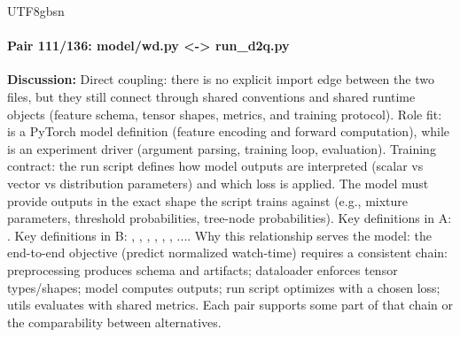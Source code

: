 \documentclass[11pt]{article}
\begin{document}
\begin{CJK*}{UTF8}{gbsn}
\paragraph{Pair 111/136: model/wd.py <-> run\_d2q.py}
\textbf{Discussion:} Direct coupling: there is no explicit import edge between the two files, but they still connect through shared conventions and shared runtime objects (feature schema, tensor shapes, metrics, and training protocol). Role fit: \texttt{} is a PyTorch model definition (feature encoding and forward computation), while \texttt{} is an experiment driver (argument parsing, training loop, evaluation). Training contract: the run script defines how model outputs are interpreted (scalar vs vector vs distribution parameters) and which loss is applied. The model must provide outputs in the exact shape the script trains against (e.g., mixture parameters, threshold probabilities, tree-node probabilities). Key definitions in A: \texttt{}. Key definitions in B: \texttt{}, \texttt{}, \texttt{}, \texttt{}, \texttt{}, \texttt{}, .... Why this relationship serves the model: the end-to-end objective (predict normalized watch-time) requires a consistent chain: preprocessing produces schema and artifacts; dataloader enforces tensor types/shapes; model computes outputs; run script optimizes with a chosen loss; utils evaluates with shared metrics. Each pair supports some part of that chain or the comparability between alternatives.


\end{CJK*}
\end{document}
